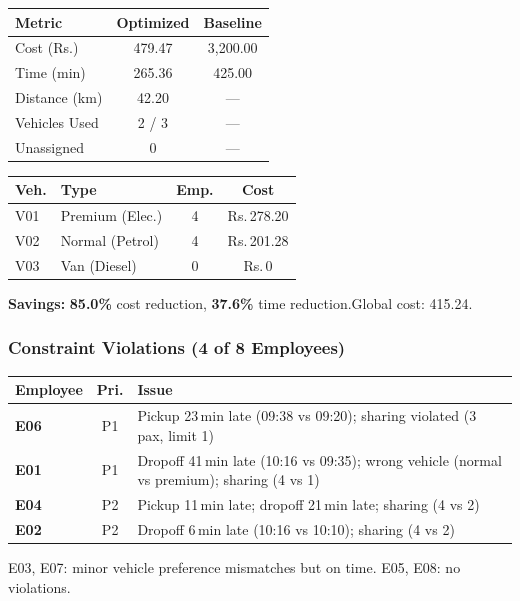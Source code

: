 \documentclass[11pt,a4paper]{article}
\newcommand{\rupee}{Rs.}
\newcommand{\saving}[1]{\textcolor{velgreen}{\textbf{#1}}}
\begin{document}
\begin{minipage}[t]{0.48\textwidth}
\begin{table}[H]
\centering
\begin{tabular}{lcc}
\toprule
\textbf{Metric} & \textbf{Optimized} & \textbf{Baseline} \\
\midrule
\rowcolor{rowalt}
Cost (\rupee) & 479.47 & 3,200.00 \\
Time (min) & 265.36 & 425.00 \\
\rowcolor{rowalt}
Distance (km) & 42.20 & --- \\
Vehicles Used & 2 / 3 & --- \\
\rowcolor{rowalt}
Unassigned & 0 & --- \\
\bottomrule
\end{tabular}
\end{table}
\end{minipage}
\hfill
\begin{minipage}[t]{0.48\textwidth}
\begin{table}[H]
\centering
\begin{tabular}{llcc}
\toprule
\textbf{Veh.} & \textbf{Type} & \textbf{Emp.} & \textbf{Cost} \\
\midrule
\rowcolor{rowalt}
V01 & Premium (Elec.) & 4 & \rupee\,278.20 \\
V02 & Normal (Petrol) & 4 & \rupee\,201.28 \\
\rowcolor{rowalt}
V03 & Van (Diesel) & 0 & \rupee\,0 \\
\bottomrule
\end{tabular}
\end{table}
\end{minipage}

\vspace{4pt}
\textbf{Savings:} \saving{85.0\%} cost reduction, \saving{37.6\%} time reduction.\quad Global cost: 415.24.

\subsubsection{Constraint Violations (4 of 8 Employees)}

\begin{warnbox}
\small
\begin{tabular}{>{\bfseries}l c p{8.5cm}}
\toprule
\textbf{Employee} & \textbf{Pri.} & \textbf{Issue} \\
\midrule
\rowcolor{red!4}
E06 & P1 & Pickup 23\,min late (09:38 vs 09:20); sharing violated (3 pax, limit 1) \\
E01 & P1 & Dropoff 41\,min late (10:16 vs 09:35); wrong vehicle (normal vs premium); sharing (4 vs 1) \\
\rowcolor{red!4}
E04 & P2 & Pickup 11\,min late; dropoff 21\,min late; sharing (4 vs 2) \\
E02 & P2 & Dropoff 6\,min late (10:16 vs 10:10); sharing (4 vs 2) \\
\bottomrule
\end{tabular}

\vspace{4pt}
E03, E07: minor vehicle preference mismatches but on time.\; E05, E08: no violations.
\end{warnbox}
\end{document}

